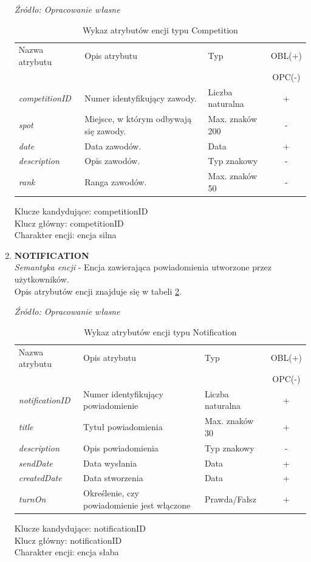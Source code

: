 \documentclass[12pt,oneside]{report}
\begin{document}
\begin{enumerate}[start=1,label={\bfseries ENC\textbackslash0\arabic*}]
	\begin{table}[H]
	    \caption{Wykaz atrybutów encji typu Competition}
	    \textit{Źródło: Opracowanie własne}
	    \label{competitionAtribute}
		\centering
		\begin{tabular}{|l|l|l|c|}
			\hline
			Nazwa atrybutu & Opis atrybutu & Typ & OBL(+) \\
			& & &  OPC(-) \\
			\hline
			\textit{competitionID} & Numer identyfikujący zawody. & Liczba naturalna & + \\
			\hline
			\textit{spot} & Miejsce, w którym odbywają się zawody. & Max. znaków 200 & - \\			\hline
			\textit{date} & Data zawodów. & Data & + \\
			\hline
			\textit{description} & Opis zawodów. & Typ znakowy & - \\
			\hline
			\textit{rank} & Ranga zawodów. &  Max. znaków 50 & - \\
			\hline
		\end{tabular}
	\end{table}
	Klucze kandydujące: competitionID \\
	Klucz główny: competitionID \\
	Charakter encji: encja silna 
	\item \textbf{NOTIFICATION}\\
	\textit{Semantyka encji} - Encja zawierająca powiadomienia utworzone przez użytkowników.
\\
Opis atrybutów encji znajduje się w tabeli \ref{NotificationAtribute}.
	\begin{table}[H]
		\caption{Wykaz atrybutów encji typu Notification }
		\textit{Źródło: Opracowanie własne}
		\label{NotificationAtribute}
		\centering
		\begin{tabular}{|l|l|l|c|}
			\hline
			Nazwa atrybutu & Opis atrybutu & Typ & OBL(+) \\
			& & &  OPC(-) \\
			\hline
			\textit{notificationID} & Numer identyfikujący powiadomienie& Liczba naturalna & + \\
			\hline
			\textit{title} &  Tytuł powiadomienia & Max. znaków 30 & + \\
			\hline
			\textit{description} & Opis powiadomienia & Typ znakowy & - \\
			\hline
			\textit{sendDate} &  Data wysłania & Data & + \\
			\hline
			\textit{createdDate} &  Data stworzenia & Data & + \\
			\hline			
			\textit{turnOn} & Określenie, czy powiadomienie jest włączone & Prawda/Fałsz & + \\
			\hline
		\end{tabular}
	\end{table}
	Klucze kandydujące: notificationID \\
	Klucz główny: notificationID \\
	Charakter encji: encja słaba \\
	

\end{enumerate}
\end{document}
